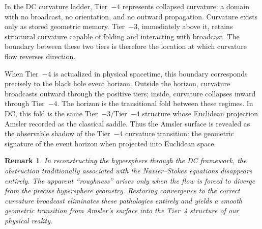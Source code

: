 \documentclass[final,onefignum,onetabnum]{siamart}
\newtheorem{remark}{Remark}
\begin{document}
In the DC curvature ladder, Tier~$-4$ represents collapsed curvature: a domain with no broadcast, no orientation, and no outward propagation. Curvature exists only as stored geometric memory. Tier~$-3$, immediately above it, retains structural curvature capable of folding and interacting with broadcast. The boundary between these two tiers is therefore the location at which curvature flow reverses direction.

When Tier~$-4$ is actualized in physical spacetime, this boundary corresponds precisely to the black hole event horizon. Outside the horizon, curvature broadcasts outward through the positive tiers; inside, curvature collapses inward through Tier~$-4$. The horizon is the transitional fold between these regimes. In DC, this fold is the same Tier~$-3$/Tier~$-4$ structure whose Euclidean projection Amsler recorded as the classical saddle. Thus the Amsler surface is revealed as the observable shadow of the Tier~$-4$ curvature transition: the geometric signature of the event horizon when projected into Euclidean space.

\begin{remark}
In reconstructing the hypersphere through the DC framework, the obstruction traditionally associated with the Navier--Stokes equations disappears entirely. The apparent ``roughness'' arises only when the flow is forced to diverge from the precise hypersphere geometry. Restoring convergence to the correct curvature broadcast eliminates these pathologies entirely and yields a smooth geometric transition from Amsler's surface into the Tier~4 structure of our physical reality.
\end{remark}
\end{document}
